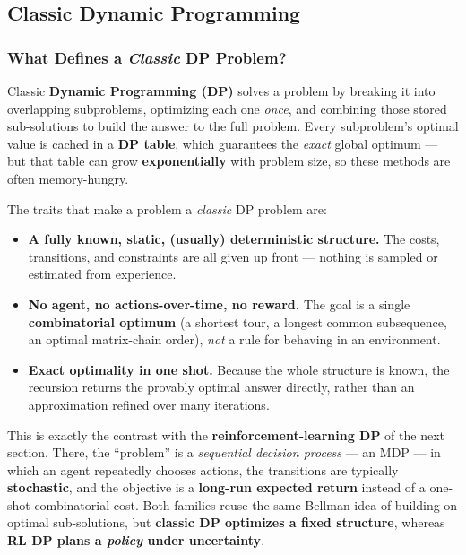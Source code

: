 \documentclass[11pt]{article}
\providecommand{\tightlist}{%
      \setlength{\itemsep}{0pt}\setlength{\parskip}{0pt}}
\begin{document}
\subsection{Classic Dynamic
Programming}\label{classic-dynamic-programming}

\label{classic-dp-intro}

\subsubsection{\texorpdfstring{What Defines a \emph{Classic} DP
Problem?}{What Defines a Classic DP Problem?}}\label{what-defines-a-classic-dp-problem}

Classic \textbf{Dynamic Programming (DP)} solves a problem by breaking
it into overlapping subproblems, optimizing each one \emph{once}, and
combining those stored sub-solutions to build the answer to the full
problem. Every subproblem's optimal value is cached in a \textbf{DP
table}, which guarantees the \emph{exact} global optimum --- but that
table can grow \textbf{exponentially} with problem size, so these
methods are often memory-hungry.

The traits that make a problem a \emph{classic} DP problem are:

\begin{itemize}
\tightlist
\item
  \textbf{A fully known, static, (usually) deterministic structure.} The
  costs, transitions, and constraints are all given up front --- nothing
  is sampled or estimated from experience.
\item
  \textbf{No agent, no actions-over-time, no reward.} The goal is a
  single \textbf{combinatorial optimum} (a shortest tour, a longest
  common subsequence, an optimal matrix-chain order), \emph{not} a rule
  for behaving in an environment.
\item
  \textbf{Exact optimality in one shot.} Because the whole structure is
  known, the recursion returns the provably optimal answer directly,
  rather than an approximation refined over many iterations.
\end{itemize}

This is exactly the contrast with the \textbf{reinforcement-learning DP}
of the next section. There, the ``problem'' is a \emph{sequential
decision process} --- an MDP --- in which an agent repeatedly chooses
actions, the transitions are typically \textbf{stochastic}, and the
objective is a \textbf{long-run expected return} instead of a one-shot
combinatorial cost. Both families reuse the same Bellman idea of
building on optimal sub-solutions, but \textbf{classic DP optimizes a
fixed structure}, whereas \textbf{RL DP plans a \emph{policy} under
uncertainty}.
\end{document}

